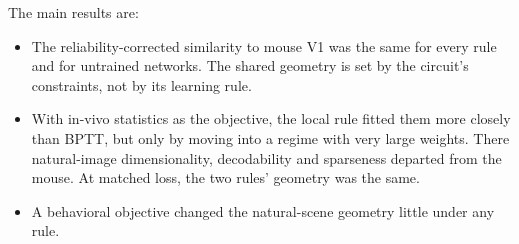 The main results are:
\begin{itemize}
\item The reliability-corrected similarity to mouse V1 was the same for every rule and for untrained
networks. The shared geometry is set by the circuit's constraints, not by its learning rule.
\item With in-vivo statistics as the objective, the local rule fitted them more closely than BPTT,
but only by moving into a regime with very large weights. There natural-image dimensionality,
decodability and sparseness departed from the mouse. At matched loss, the two rules' geometry was
the same.
\item A behavioral objective changed the natural-scene geometry little under any rule.
\end{itemize}
